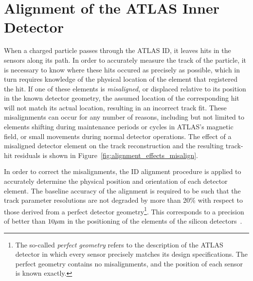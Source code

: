 \chapter[Alignment of the ATLAS Inner Detector][Alignment of the ATLAS Inner Detector]{Alignment of the ATLAS Inner Detector}
\label{ch:alignment}

When a charged particle passes through the ATLAS ID, it leaves hits in the sensors along its path.
In order to accurately measure the track of the particle, it is necessary to know where these hits occured as precisely as possible, which in turn requires knowledge of the physical location of the element that registered the hit.
If one of these elements is \emph{misaligned}, or displaced relative to its position in the known detector geometry, the assumed location of the corresponding hit will not match its actual location, resulting in an incorrect track fit.
These misalignments can occur for any number of reasons, including but not limited to elements shifting during maintenance periods or cycles in ATLAS's magnetic field, or small movements during normal detector operations.
The effect of a misaligned detector element on the track reconstruction and the resulting track-hit residuals is shown in Figure~\ref{fig:alignment_effects_misalign}. 

In order to correct the misalignments, the ID alignment procedure is applied to accurately determine the physical position and orientation of each detector element.
The baseline accuracy of the alignment is required to be such that the track parameter resolutions are not degraded by more than 20\% with respect to those derived from a perfect detector geometry\footnote{The so-called \emph{perfect geometry} refers to the description of the ATLAS detector in which every sensor precisely matches its design specifications.  The perfect geometry contains no misalignments, and the position of each sensor is known exactly.}.
This corresponds to a precision of better than $10\mu\textrm{m}$ in the positioning of the elements of the silicon detectors~\cite{TDR-ID1}.

